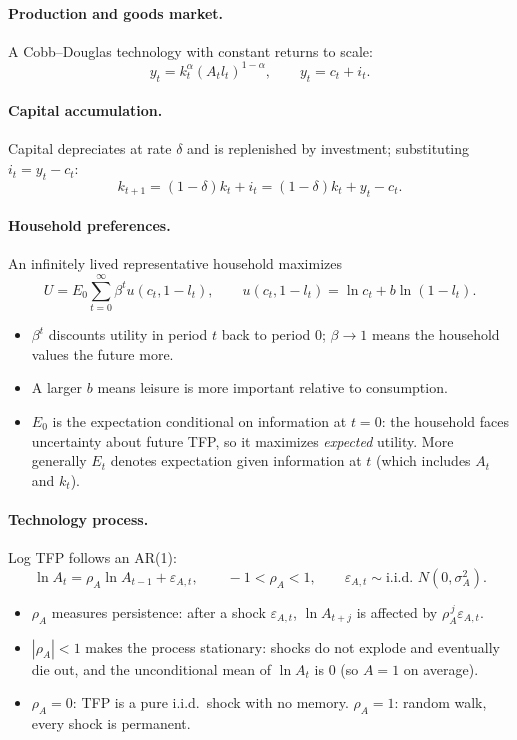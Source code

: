 \paragraph{Production and goods market.} A Cobb--Douglas technology with constant returns to scale:
\begin{equation}\label{eq:s6_prod}
y_t=k_t^{\alpha}(A_tl_t)^{1-\alpha},\qquad y_t=c_t+i_t .
\end{equation}

\paragraph{Capital accumulation.} Capital depreciates at rate $\delta$ and is replenished by investment; substituting $i_t=y_t-c_t$:
\begin{equation}\label{eq:s6_kacc}
k_{t+1}=(1-\delta)k_t+i_t=(1-\delta)k_t+y_t-c_t .
\end{equation}

\paragraph{Household preferences.} An infinitely lived representative household maximizes
\begin{equation}\label{eq:s6_U}
U=E_0\sum_{t=0}^\infty\beta^t u(c_t,1-l_t),\qquad u(c_t,1-l_t)=\ln c_t+b\ln(1-l_t).
\end{equation}
\begin{itemize}
  \item $\beta^t$ discounts utility in period $t$ back to period $0$; $\beta\to1$ means the household values the future more.
  \item A larger $b$ means leisure is more important relative to consumption.
  \item $E_0$ is the expectation conditional on information at $t=0$: the household faces uncertainty about future TFP, so it maximizes \emph{expected} utility. More generally $E_t$ denotes expectation given information at $t$ (which includes $A_t$ and $k_t$).
\end{itemize}

\paragraph{Technology process.} Log TFP follows an AR(1):
\begin{equation}\label{eq:s6_ar1}
\ln A_t=\rho_A\ln A_{t-1}+\varepsilon_{A,t},\qquad -1<\rho_A<1,\qquad \varepsilon_{A,t}\sim\text{i.i.d. }N(0,\sigma_A^2).
\end{equation}
\begin{itemize}
  \item $\rho_A$ measures persistence: after a shock $\varepsilon_{A,t}$, $\ln A_{t+j}$ is affected by $\rho_A^{\,j}\varepsilon_{A,t}$.
  \item $|\rho_A|<1$ makes the process stationary: shocks do not explode and eventually die out, and the unconditional mean of $\ln A_t$ is $0$ (so $A=1$ on average).
  \item $\rho_A=0$: TFP is a pure i.i.d.\ shock with no memory. $\rho_A=1$: random walk, every shock is permanent.
\end{itemize}


